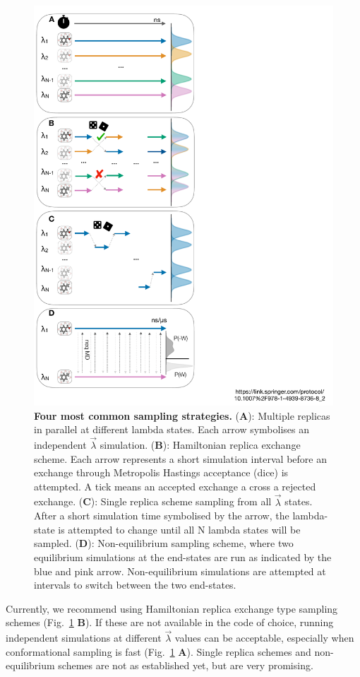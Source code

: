 \documentclass[9pt,bestpractices]{livecoms}
\begin{document}
\begin{figure}
    \includegraphics[width=0.88\columnwidth]{figures/fig8_sampl_scheme/Figure.pdf}
    \caption{\textbf{Four most common sampling strategies.} (\textbf{A}): Multiple replicas in parallel at different lambda states. Each arrow symbolises an independent $\vec{\lambda}$ simulation. (\textbf{B}): Hamiltonian replica exchange scheme. Each arrow represents a short simulation interval before an exchange through Metropolis Hastings acceptance (dice) is attempted. A tick means an accepted exchange a cross a rejected exchange. (\textbf{C}): Single replica scheme sampling from all $\vec{\lambda}$ states. After a short simulation time symbolised by the arrow, the lambda-state is attempted to change until all N lambda states will be sampled. (\textbf{D}): Non-equilibrium sampling scheme, where two equilibrium simulations at the end-states are run as indicated by the blue and pink arrow. Non-equilibrium simulations are attempted at intervals to switch between the two end-states.}
    \label{fig:fig_sampling_scheme}
\end{figure} 

Currently, we recommend using Hamiltonian replica exchange type sampling schemes (Fig.~\ref{fig:fig_sampling_scheme} \textbf{B}). If these are not available in the code of choice, running independent simulations at different $\vec{\lambda}$ values can be acceptable, especially when conformational sampling is fast (Fig.~\ref{fig:fig_sampling_scheme} \textbf{A}). Single replica schemes and non-equilibrium schemes are not as established yet, but are very promising.
\end{document}
